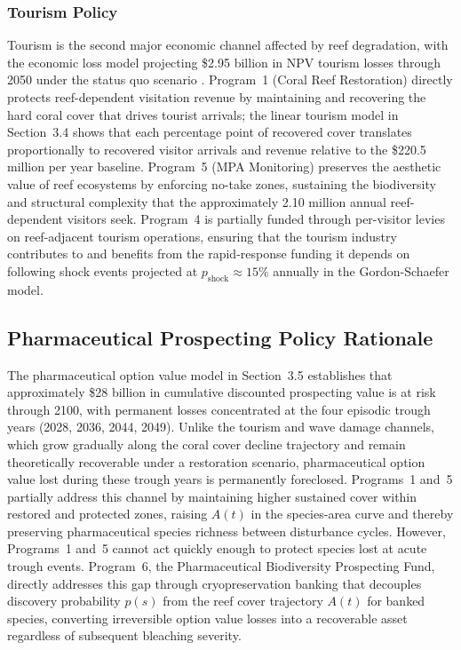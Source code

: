 \documentclass[10pt,letterpaper]{article}
\begin{document}
\subsubsection{Tourism Policy}

Tourism is the second major economic channel affected by reef degradation, with the economic loss model projecting \$2.95 billion in NPV tourism losses through 2050 under the status quo scenario \cite{spalding_tourism_2017}. Program~1 (Coral Reef Restoration) directly protects reef-dependent visitation revenue by maintaining and recovering the hard coral cover that drives tourist arrivals; the linear tourism model in Section~3.4 shows that each percentage point of recovered cover translates proportionally to recovered visitor arrivals and revenue relative to the \$220.5 million per year baseline. Program~5 (MPA Monitoring) preserves the aesthetic value of reef ecosystems by enforcing no-take zones, sustaining the biodiversity and structural complexity that the approximately 2.10 million annual reef-dependent visitors seek. Program~4 is partially funded through per-visitor levies on reef-adjacent tourism operations, ensuring that the tourism industry contributes to and benefits from the rapid-response funding it depends on following shock events projected at $p_{\text{shock}} \approx 15\%$ annually in the Gordon-Schaefer model.

\subsection{Pharmaceutical Prospecting Policy Rationale}
\label{sec:pharma-policy}

The pharmaceutical option value model in Section~3.5 establishes that approximately \$28 billion in cumulative discounted prospecting value is at risk through 2100, with permanent losses concentrated at the four episodic trough years (2028, 2036, 2044, 2049). Unlike the tourism and wave damage channels, which grow gradually along the coral cover decline trajectory and remain theoretically recoverable under a restoration scenario, pharmaceutical option value lost during these trough years is permanently foreclosed. Programs~1 and~5 partially address this channel by maintaining higher sustained cover within restored and protected zones, raising $A(t)$ in the species-area curve and thereby preserving pharmaceutical species richness between disturbance cycles. However, Programs~1 and~5 cannot act quickly enough to protect species lost at acute trough events. Program~6, the Pharmaceutical Biodiversity Prospecting Fund, directly addresses this gap through cryopreservation banking that decouples discovery probability $p(s)$ from the reef cover trajectory $A(t)$ for banked species, converting irreversible option value losses into a recoverable asset regardless of subsequent bleaching severity.
\end{document}
